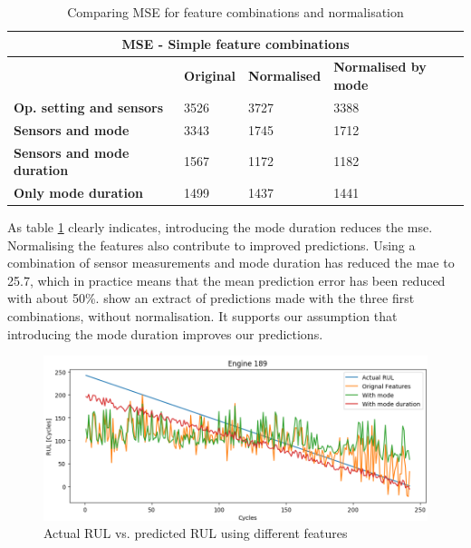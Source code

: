 \documentclass[english, a4paper]{report}
\begin{document}
{{{{                \begin{table}[H]
                    \centering
                    \begin{tabular}{|l|l|l|l|}
                    \hline
                    \multicolumn{4}{|c|}{\textbf{MSE - Simple feature combinations}} \\ \hline
                     & \textbf{Original} & \textbf{Normalised} & \textbf{Normalised by mode} \\ \hline
                    \textbf{Op. setting and sensors} & 3526 & 3727 & 3388 \\ \hline
                    \textbf{Sensors and mode} & 3343 & 1745 & 1712 \\ \hline
                    \textbf{Sensors and mode duration} & 1567 & 1172 & 1182 \\ \hline
                    \textbf{Only mode duration} & 1499 & 1437 & 1441 \\ \hline
                    \end{tabular}
                    \caption{Comparing MSE for feature combinations and normalisation}
                    \label{NASAFeatureCombosMSE}
                \end{table}
                
                As table \ref{NASAFeatureCombosMSE} clearly indicates, introducing the mode duration reduces the \gls{mse}. Normalising the features also contribute to improved predictions. Using a combination of sensor measurements and mode duration has reduced the \gls{mae} to 25.7, which in practice means that the mean prediction error has been reduced with about 50\%.  show an extract of predictions made with the three first combinations, without normalisation. It supports our assumption that introducing the mode duration improves our predictions.
                
                \begin{figure}[H]
                    \centering \includegraphics[width=1\textwidth]{PredictionNASA1D}
                    \caption{Actual RUL vs. predicted RUL using different features}
                    \label{fig:BasicFeaturePrediction}
                \end{figure}
            
}}}}
\end{document}
